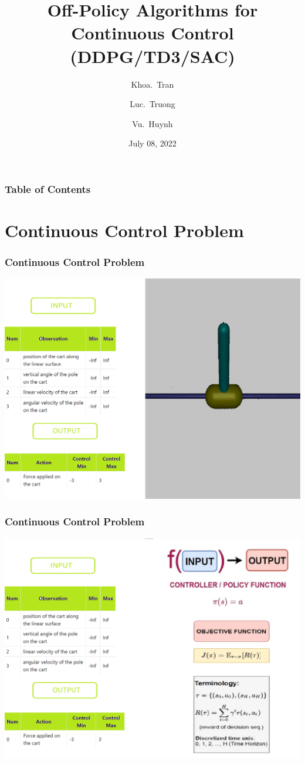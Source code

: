 \documentclass{beamer}
\title[Off-Policy Algorithms] %
{Off-Policy Algorithms for Continuous Control (DDPG/TD3/SAC)}
\author[Khoa, Luc, Vu] %
{Khoa.~Tran\inst{1} \and Luc.~Truong\inst{2} \and Vu.~Huynh\inst{3}}
\institute[] %
{
  \inst{1}%
  20520222
 `~
  \inst{2}%
  20520241 
  ~
  \inst{3}%
  20520864
  \\ \vspace{1.5cm}
    \large Class : CS106.M21.KHTN
    \\ \vspace{0.5cm}
    Supervisor: Dr. Luong Ngoc Hoang
}
\date[CS106] %
{July 08, 2022}
\begin{document}
\frame{\titlepage}


\begin{frame}
        \frametitle{Table of Contents}
        \tableofcontents[2]
\end{frame}


\section{Continuous Control Problem}

\begin{frame}
\frametitle{Continuous Control Problem}
    \begin{center}
        \includegraphics[scale=0.4]{problem1.png}
    \end{center}
\end{frame}

\begin{frame}
\frametitle{Continuous Control Problem}
    \begin{center}
        \includegraphics[scale=0.4]{problem2.png}
    \end{center}
\end{frame}
\end{document}
